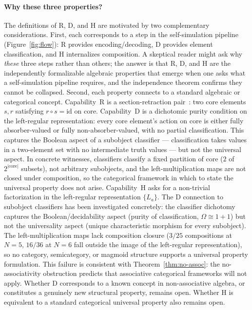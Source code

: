 \documentclass[sigconf,screen,review,anonymous]{acmart}
\newcommand{\core}{\mathrm{core}}
\theoremstyle{remark}
\begin{document}
\paragraph{Why these three properties?}
The definitions of R, D, and H are motivated by two complementary considerations. First, each corresponds to a step in the self-simulation pipeline (Figure~\ref{fig:flow}): R provides encoding/decoding, D provides element classification, and H internalizes composition. A skeptical reader might ask why \emph{these} three steps rather than others; the answer is that R, D, and H are the independently formalizable algebraic properties that emerge when one asks what a self-simulation pipeline requires, and the independence theorem confirms they cannot be collapsed. Second, each property connects to a standard algebraic or categorical concept. Capability~R is a section-retraction pair~\cite{maclane71}: two core elements $s, r$ satisfying $r \circ s = \mathrm{id}$ on core. Capability~D is a dichotomic purity condition on the left-regular representation: every core element's action on core is either fully absorber-valued or fully non-absorber-valued, with no partial classification. This captures the Boolean aspect of a subobject classifier --- classification takes values in a two-element set with no intermediate truth values --- but not the universal aspect. In concrete witnesses, classifiers classify a fixed partition of core ($2$ of $2^{|\core|}$ subsets), not arbitrary subobjects, and the left-multiplication maps are not closed under composition, so the categorical framework in which to state the universal property does not arise. Capability~H asks for a non-trivial factorization in the left-regular representation $\{L_a\}$. The D connection to subobject classifiers has been investigated concretely: the classifier dichotomy captures the Boolean/decidability aspect (purity of classification, $\Omega \cong 1+1$) but not the universality aspect (unique characteristic morphism for every subobject). The left-multiplication maps lack composition closure ($3/25$ compositions at $N\!=\!5$, $16/36$ at $N\!=\!6$ fall outside the image of the left-regular representation), so no category, semicategory, or magmoid structure supports a universal property formulation. This failure is consistent with Theorem~\ref{thm:no-assoc}: the no-associativity obstruction predicts that associative categorical frameworks will not apply. Whether D corresponds to a known concept in non-associative algebra, or constitutes a genuinely new structural property, remains open. Whether H is equivalent to a standard categorical universal property also remains open.
\end{document}
